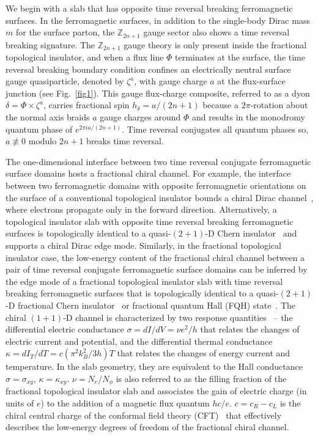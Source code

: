 We begin with a slab that has opposite time reversal breaking ferromagnetic surfaces. In the ferromagnetic surfaces, in addition to the single-body Dirac mass $m$ for the surface parton, the $\mathbb{Z}_{2n+1}$ gauge sector also shows a time reversal breaking signature. The $\mathbb{Z}_{2n+1}$ gauge theory is only present inside the fractional topological insulator, and when a flux line $\Phi$ terminates at the surface, the time reversal breaking boundary condition confines an electrically neutral surface gauge quasiparticle, denoted by $\zeta^a$, with gauge charge $a$ at the flux-surface junction (see Fig.~\ref{fig1}). This gauge flux-charge composite, referred to as a dyon $\delta=\Phi\times\zeta^a$, carries fractional spin $h_\delta=a/(2n+1)$ because a $2\pi$-rotation about the normal axis braids $a$ gauge charges around $\Phi$ and results in the monodromy quantum phase of $e^{2\pi ia/(2n+1)}$. Time reversal conjugates all quantum phases so, $a\not\equiv0$ modulo $2n+1$ breaks time reversal.

The one-dimensional interface between two time reversal conjugate ferromagnetic surface domains hosts a fractional chiral channel. For example, the interface between two ferromagnetic domains with opposite ferromagnetic orientations on the surface of a conventional topological insulator bounds a chiral Dirac channel~\cite{TeoKane,FuKanechargetransport09,QiWittenZhang13}, where electrons propagate only in the forward direction. Alternatively, a topological insulator slab with opposite time reversal breaking ferromagnetic surfaces is topologically identical to a quasi-$(2+1)$-D Chern insulator~\cite{Haldane1988,liu2016quantum} and supports a chiral Dirac edge mode. Similarly, in the fractional topological insulator case, the low-energy content of the fractional chiral channel between a pair of time reversal conjugate ferromagnetic surface domains can be inferred by the edge mode of a fractional topological insulator slab with time reversal breaking ferromagnetic surfaces that is topologically identical to a quasi-$(2+1)$-D fractional Chern insulator~\cite{RegnaultBernevigfractionchern,NeupertSantosChamonMudry11,TangMeiWen11,ShengGuSunSheng11} or fractional quantum Hall (\hypertarget{FQH}{FQH}) state~\cite{FQHE_Review}. The chiral $(1+1)$-D channel is characterized by two response quantities~\cite{Laughlin_IQHE, Halperin82, Hatsugai93, Schulz00, Volovik92, KaneFisher97, Cappelli01, Kitaev06, Luttinger64} -- the differential electric conductance $\sigma=dI/dV=\nu e^2/h$ that relates the changes of electric current and potential, and the differential thermal conductance $\kappa=dI_T/dT=c(\pi^2k_B^2/3h)T$ that relates the changes of energy current and temperature. In the slab geometry, they are equivalent to the Hall conductance $\sigma=\sigma_{xy}$, $\kappa=\kappa_{xy}$. $\nu=N_e/N_\phi$ is also referred to as the filling fraction of the fractional topological insulator slab and associates the gain of electric charge (in units of $e$) to the addition of a magnetic flux quantum $hc/e$. $c=c_R-c_L$ is the chiral central charge of the conformal field theory (\hypertarget{CFT}{CFT})~\cite{bigyellowbook} that effectively describes the low-energy degrees of freedom of the fractional chiral channel. 


